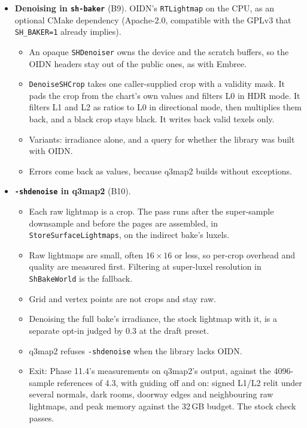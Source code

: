 \documentclass[11pt,a4paper]{article}
\begin{document}
\begin{itemize}
\begin{itemize}
    benchmark and on a hard indoor map; the stock check passes.
  \end{itemize}
\item \textbf{Denoising in \texttt{sh-baker}} (B9). OIDN's \texttt{RTLightmap} on the CPU, as an
  optional CMake dependency (Apache-2.0, compatible with the GPLv3 that \texttt{SH\_BAKER=1} already
  implies).
  \begin{itemize}
  \item An opaque \texttt{SHDenoiser} owns the device and the scratch buffers, so the OIDN headers
    stay out of the public ones, as with Embree.
  \item \texttt{DenoiseSHCrop} takes one caller-supplied crop with a validity mask. It pads the crop
    from the chart's own values and filters L0 in HDR mode. It filters L1 and L2 as ratios to L0 in
    directional mode, then multiplies them back, and a black crop stays black. It writes back valid
    texels only.
  \item Variants: irradiance alone, and a query for whether the library was built with OIDN.
  \item Errors come back as values, because q3map2 builds without exceptions.
  \end{itemize}
\item \textbf{\texttt{-shdenoise} in q3map2} (B10).
  \begin{itemize}
  \item Each raw lightmap is a crop. The pass runs after the super-sample downsample and before the
    pages are assembled, in \texttt{StoreSurfaceLightmaps}, on the indirect bake's luxels.
  \item Raw lightmaps are small, often $16\times16$ or less, so per-crop overhead and quality are
    measured first. Filtering at super-luxel resolution in \texttt{ShBakeWorld} is the fallback.
  \item Grid and vertex points are not crops and stay raw.
  \item Denoising the full bake's irradiance, the stock lightmap with it, is a
    separate opt-in judged by 0.3 at the draft preset.
  \item q3map2 refuses \texttt{-shdenoise} when the library lacks OIDN.
  \item Exit: Phase 11.4's measurements on q3map2's output, against the 4096-sample references of
    4.3, with guiding off and on: signed L1/L2 relit under several normals, dark rooms, doorway
    edges and neighbouring raw lightmaps, and peak memory against the 32\,GB budget. The stock
    check passes.
  \end{itemize}
\end{itemize}
\end{document}

